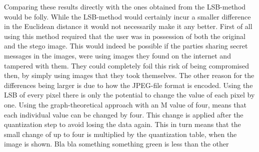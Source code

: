 Comparing these results directly with the ones obtained from the LSB-method would be folly.
While the LSB-method would certainly incur a smaller difference in the Euclidean distance it would not necessarily make it any better.
First of all using this method required that the user was in possession of both the original and the stego image.
This would indeed be possible if the parties sharing secret messages in the images, were using images they found on the internet and tampered with them.
They could completely foil this risk of being compromised then, by simply using images that they took themselves.
The other reason for the differences being larger is due to how the JPEG-file format is encoded.
Using the LSB of every pixel there is only the potential to change the value of each pixel by one.
Using the graph-theoretical approach with an M value of four, means that each individual value can be changed by four. 
This change is applied after the quantization step to avoid losing the data again.
This in turn means that the small change of up to four is multiplied by the quantization table, when the image is shown.
Bla bla something something green is less than the other